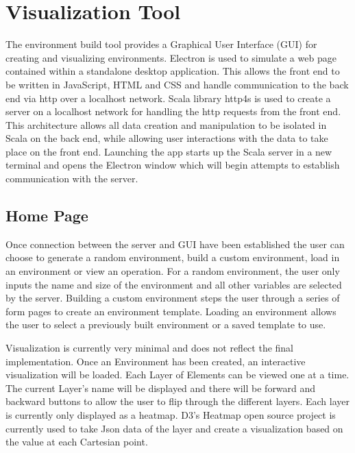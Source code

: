 \section{Visualization Tool}
The environment build tool provides a Graphical User Interface (GUI) for creating and visualizing environments.
Electron  is used to simulate a web page contained within a standalone desktop application.
This allows the front end to be written in JavaScript, HTML and CSS and handle communication to the back end via http over a localhost network.
Scala library http4s  is used to create a server on a localhost network for handling the http requests from the front end.
This architecture allows all data creation and manipulation to be isolated in Scala on the back end, while allowing user interactions with the data to take place on the front end.
Launching the app starts up the Scala server in a new terminal and opens the Electron window which will begin attempts to establish communication with the server.


\subsection{Home Page}
Once connection between the server and GUI have been established the user can choose to generate a random environment, build a custom environment, load in an environment or view an operation. 
For a random environment, the user only inputs the name and size of the environment and all other variables are selected by the server.
Building a custom environment steps the user through a series of form pages to create an environment template.
Loading an environment allows the user to select a previously built environment or a saved template to use.

Visualization is currently very minimal and does not reflect the final implementation.
Once an Environment has been created, an interactive visualization will be loaded.
Each Layer of Elements can be viewed one at a time.
The current Layer’s name will be displayed and there will be forward and backward buttons to allow the user to flip through the different layers.
Each layer is currently only displayed as a heatmap.
D3’s Heatmap open source project is currently used to take Json data of the layer and create a visualization based on the value at each Cartesian point.


